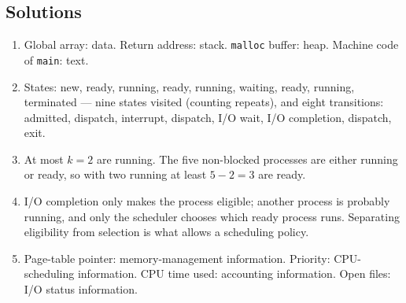 \documentclass[11pt]{article}
\begin{document}
\subsection*{Solutions}
\begingroup\small
\begin{enumerate}
  \item Global array: data. Return address: stack. \texttt{malloc} buffer:
        heap. Machine code of \texttt{main}: text.
  \item States: new, ready, running, ready, running, waiting, ready, running,
        terminated --- nine states visited (counting repeats), and eight
        transitions: admitted, dispatch, interrupt, dispatch, I/O wait, I/O
        completion, dispatch, exit.
  \item At most $k=2$ are running. The five non-blocked processes are either
        running or ready, so with two running at least $5-2=3$ are ready.
  \item I/O completion only makes the process eligible; another process is
        probably running, and only the scheduler chooses which ready process
        runs. Separating eligibility from selection is what allows a
        scheduling policy.
  \item Page-table pointer: memory-management information. Priority:
        CPU-scheduling information. CPU time used: accounting information. Open
        files: I/O status information.
\end{enumerate}
\endgroup



\end{document}
